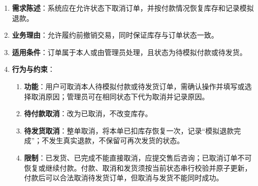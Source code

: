 \begin{enumerate}
\item {\bfseries 需求陈述}：系统应在允许状态下取消订单，并按付款情况恢复库存和记录模拟退款。
\item {\bfseries 业务理由}：允许履约前撤销交易，同时保证库存与订单状态一致。
\item {\bfseries 适用条件}：订单属于本人或由管理员处理，且状态为待模拟付款或待发货。
\item {\bfseries 行为与约束}：
\begin{enumerate}
\item {\bfseries 功能}：用户可取消本人待模拟付款或待发货订单，需确认操作并填写或选择取消原因；管理员可在相同状态下代为取消并记录原因。
\item {\bfseries 待付款取消}：改为已取消，不改变库存。
\item {\bfseries 待发货取消}：整单取消，将本单已扣库存恢复一次，记录“模拟退款完成”；不发生真实退款，不保留可再次发货的状态。
\item {\bfseries 限制}：已发货、已完成不能直接取消，应提交售后咨询；已取消订单不可恢复或继续付款。付款、取消和发货须按当前状态串行校验并原子更新，付款后可以合法取消待发货订单，但取消与发货不能同时成功。
\end{enumerate}

\end{enumerate}


